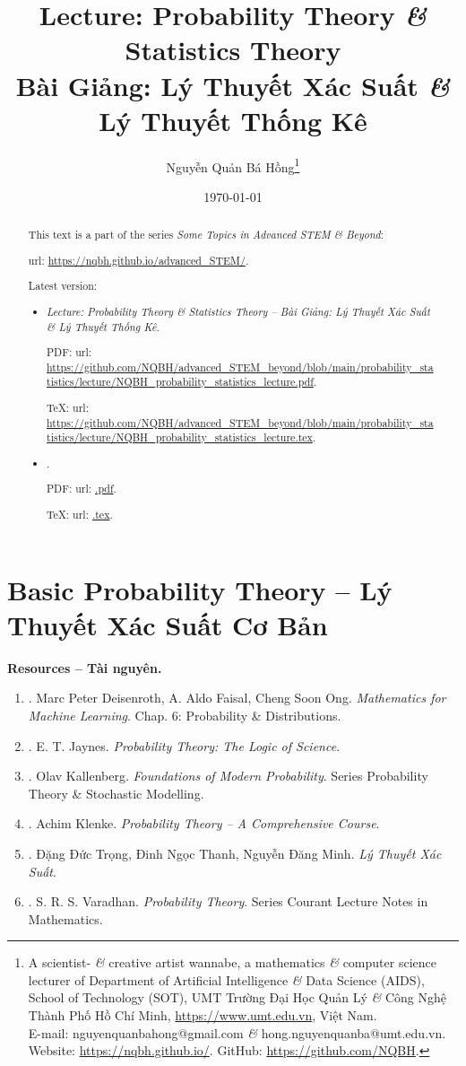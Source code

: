 \documentclass{article}
\title{Lecture: Probability Theory {\it\&} Statistics Theory\\Bài Giảng: Lý Thuyết Xác Suất {\it\&} Lý Thuyết Thống Kê}
\author{Nguyễn Quản Bá Hồng\footnote{A scientist- {\it\&} creative artist wannabe, a mathematics {\it\&} computer science lecturer of Department of Artificial Intelligence {\it\&} Data Science (AIDS), School of Technology (SOT), UMT Trường Đại Học Quản Lý {\it\&} Công Nghệ Thành Phố Hồ Chí Minh, \url{https://www.umt.edu.vn}, Việt Nam.\\E-mail: {\sf nguyenquanbahong@gmail.com} {\it\&} {\sf hong.nguyenquanba@umt.edu.vn}. Website: \url{https://nqbh.github.io/}. GitHub: \url{https://github.com/NQBH}.}}
\date{\today}
\begin{document}
\maketitle
\begin{abstract}
	This text is a part of the series {\it Some Topics in Advanced STEM \& Beyond}:
	
	{\sc url}: \url{https://nqbh.github.io/advanced_STEM/}.
	
	Latest version:
	\begin{itemize}
		\item {\it Lecture: Probability Theory \& Statistics Theory -- Bài Giảng: Lý Thuyết Xác Suất \& Lý Thuyết Thống Kê}.
		
		PDF: {\sc url}: \url{https://github.com/NQBH/advanced_STEM_beyond/blob/main/probability_statistics/lecture/NQBH_probability_statistics_lecture.pdf}.
		
		\TeX: {\sc url}: \url{https://github.com/NQBH/advanced_STEM_beyond/blob/main/probability_statistics/lecture/NQBH_probability_statistics_lecture.tex}.
		\item {\it }.
		
		PDF: {\sc url}: \url{.pdf}.
		
		\TeX: {\sc url}: \url{.tex}.
	\end{itemize}
\end{abstract}
\tableofcontents


\section{Basic Probability Theory -- Lý Thuyết Xác Suất Cơ Bản}
\textbf{\textsf{Resources -- Tài nguyên.}}
\begin{enumerate}
	\item \cite{Deisenroth_Faisal_Ong2024}. {\sc Marc Peter Deisenroth, A. Aldo Faisal, Cheng Soon Ong}. {\it Mathematics for Machine Learning}. Chap. 6: Probability \& Distributions.
	\item \cite{Jaynes2003}. {\sc E. T. Jaynes}. {\it Probability Theory: The Logic of Science}.
	\item \cite{Kallenberg2021}. {\sc Olav Kallenberg}. {\it Foundations of Modern Probability}. Series Probability Theory \& Stochastic Modelling.
	\item \cite{Klenke2020}. {\sc Achim Klenke}. {\it Probability Theory -- A Comprehensive Course}.
	\item \cite{Trong_Thanh_Minh_xac_suat}. {\sc Đặng Đức Trọng, Đinh Ngọc Thanh, Nguyễn Đăng Minh}. {\it Lý Thuyết Xác Suất}.
	\item \cite{Varadhan2001}. {\sc S. R. S. Varadhan}. {\it Probability Theory}. Series Courant Lecture Notes in Mathematics.
\end{enumerate}
\end{document}
